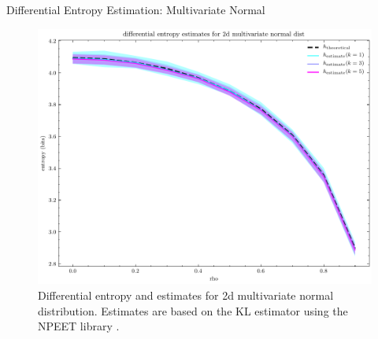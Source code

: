 \documentclass{beamer}
\begin{document}

  \begin{frame}{Differential Entropy Estimation: Multivariate Normal}
    \begin{figure}[htb] \centering 
      \includegraphics[width=0.7\linewidth]{multivar_normal.pdf}
      \caption{Differential entropy and estimates for 2d multivariate normal distribution. Estimates are based on the KL estimator \cite{ref:Kozachenko1987SampleEstimate} using the NPEET library \cite{ref:VerSteeg2019NPEET}.} 
      \label{fig:multivar-normal-valid} 
    \end{figure}
  \end{frame}
\end{document}
